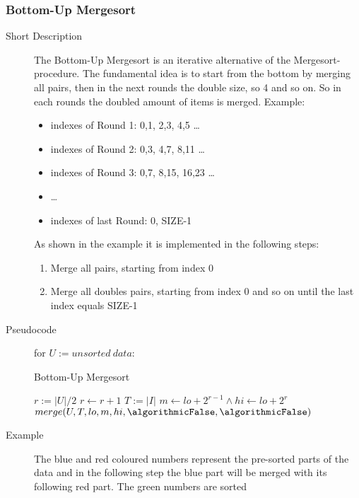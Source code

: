 \documentclass[11pt]{amsart}
\begin{document}
\subsubsection{Bottom-Up Mergesort}
\begin{description}
	\item[Short Description] The Bottom-Up Mergesort is an iterative alternative of the Mergesort-procedure. The fundamental idea is to start from the bottom by merging all pairs, then in the next rounds the double size, so 4 and so on. So in each rounds the doubled amount of items is merged. Example:
		\begin{itemize}
			\item indexes of Round 1: 0,1, 2,3, 4,5 \ldots
			\item indexes of Round 2: 0,3, 4,7, 8,11 \ldots
			\item indexes of Round 3: 0,7, 8,15, 16,23 \ldots
			\item \ldots
			\item indexes of last Round: 0, SIZE-1 			
		\end{itemize}
As shown in the example it is implemented in the following steps:
		\begin{enumerate}
			\item Merge all pairs, starting from index 0
			\item Merge all doubles pairs, starting from index 0 and so on until the last index equals SIZE-1
		\end{enumerate}
	\item[Pseudocode] for $U := unsorted~data$:
	\begin{algorithm}
	\caption{Bottom-Up Mergesort}
		\begin{algorithmic}[1]
			\State $r := |U| / 2$
				\State $r \gets r + 1$ 
			\EndIf
			\State $T := |I|$
				\State $m \gets lo+2^{r-1} \land hi \gets lo+2^{r}$
				\State $merge(U, T, lo, m, hi, \algorithmicFalse, \algorithmicFalse)$
			\EndFor
		\EndProcedure
		\end{algorithmic}
	\end{algorithm}	
	\item[Example] The {\color{blue}blue} and {\color{red}red} coloured numbers represent the pre-sorted parts of the data and in the following step the blue part will be merged with its following red part. The {\color{green}green} numbers are sorted \\[.5cm]

\end{description}
\end{document}
